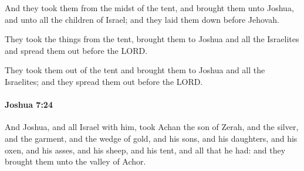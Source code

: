 			\begin{versebox}
					\item[BHS] 
					\item[ASV] And they took them from the midst of the tent, and brought them unto Joshua, and unto all the children of Israel; and they laid them down before Jehovah.
					\item[NIV] They took the things from the tent, brought them to Joshua and all the Israelites and spread them out before the LORD.
					\item[NRSV] They took them out of the tent and brought them to Joshua and all the Israelites; and they spread them out before the LORD.
			\end{versebox}

		\paragraph{Joshua 7:24} %
			\label{JOSHUA-7-24}

			And Joshua, and all Israel with him, took Achan the son of Zerah, and the silver, and the garment, and the wedge of gold, and his sons, and his daughters, and his oxen, and his asses, and his sheep, and his tent, and all that he had: and they brought them unto the valley of Achor.

